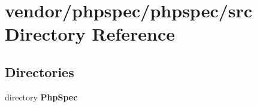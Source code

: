 \section{vendor/phpspec/phpspec/src Directory Reference}
\label{dir_9b63e77e15174a267e7f0ebfec8f6571}
\subsection*{Directories}
\begin{DoxyCompactItemize}
\item 
directory {\bf Php\+Spec}
\end{DoxyCompactItemize}
